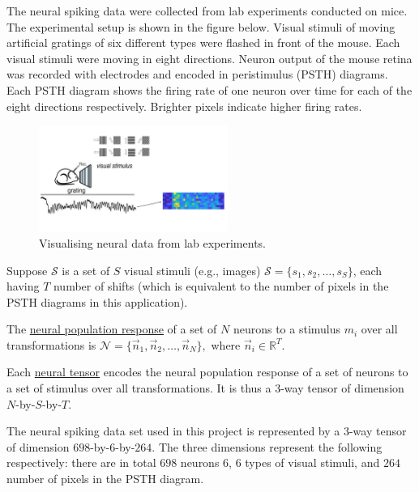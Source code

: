 The neural spiking data were collected from lab experiments conducted on mice. The experimental setup is shown in the figure below. Visual stimuli of moving artificial gratings of six different types were flashed in front of the mouse. Each visual stimuli were moving in eight directions. Neuron output of the mouse retina was recorded with electrodes and encoded in peristimulus (PSTH) diagrams. Each PSTH diagram shows the firing rate of one neuron over time for each of the eight directions respectively. Brighter pixels indicate higher firing rates.
 \begin{figure}[H]
        \centering
            \includegraphics[width=0.55\textwidth]{figures/Slide5.jpg}
            \caption{Visualising neural data from lab experiments.}
    \end{figure}
    
\begin{defn}
    Suppose $\mathcal{S}$ is a set of $S$ visual stimuli (e.g., images) $\mathcal{S} = \{s_1, s_2,\dots, s_S\}$, each having $T$ number of shifts (which is equivalent to the number of pixels in the PSTH diagrams in this application).
    
    The \underline{neural population response} of a set of $N$ neurons to a stimulus $m_i$ over all transformations is $\mathcal{N} = \{\vec{n}_1, \vec{n}_2, \dots, \vec{n}_N\},$ where $\vec{n}_i \in \mathbb{R}^T$. 
\end{defn}

\begin{defn}
    Each \underline{neural tensor} encodes the neural population response of a set of neurons to a set of stimulus over all transformations. It is thus a $3$-way tensor of dimension $N$-by-$S$-by-$T$.
\end{defn} 

The neural spiking data set used in this project is represented by a $3$-way tensor of dimension $698$-by-$6$-by-$264$. The three dimensions represent the following respectively: there are in total $698$ neurons $6$, $6$ types of visual stimuli, and $264$ number of pixels in the PSTH diagram.

